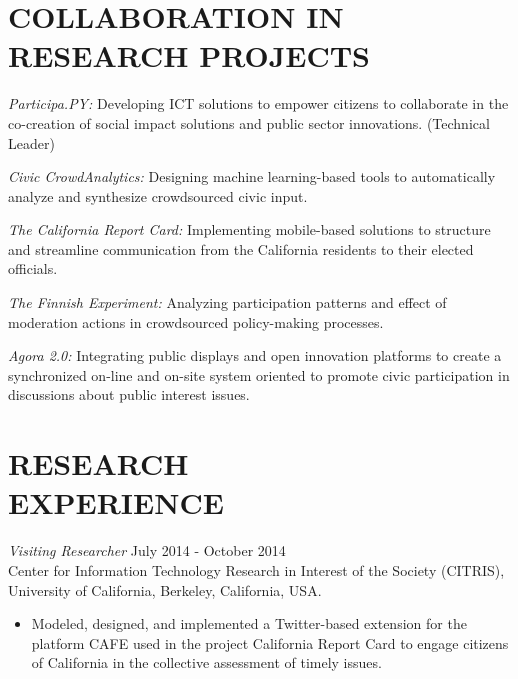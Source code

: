 \documentclass[line,margin]{res}
\begin{document}
\begin{resume}
 
\section{COLLABORATION IN RESEARCH PROJECTS}
	{\sl Participa.PY:} Developing ICT solutions to empower citizens to collaborate in the co-creation of social impact solutions and public sector innovations. (Technical Leader)
	
	{\sl Civic CrowdAnalytics:} Designing machine learning-based tools to automatically analyze and synthesize crowdsourced civic input.
	
	{\sl The California Report Card:} Implementing mobile-based solutions to structure and streamline communication from the California residents to their elected officials.

	{\sl The Finnish Experiment:} Analyzing participation patterns and effect of moderation actions in crowdsourced policy-making processes.
	
	
	{\sl Agora 2.0:} Integrating public displays and open innovation platforms to create a synchronized on-line and on-site system oriented to promote civic participation in discussions about public interest issues.

	
		
 
 
\section{RESEARCH \\ EXPERIENCE}
{\sl Visiting Researcher} \hfill July 2014 - October 2014 \\
Center for Information Technology Research in Interest of the Society (CITRIS), University of California, Berkeley, California, USA.
\begin{itemize}  \itemsep -2pt %
\item Modeled, designed, and implemented a Twitter-based extension for the platform CAFE used in the project California Report Card to engage citizens of California in the collective assessment of timely issues.
\end{itemize}


\end{resume}
\end{document}

